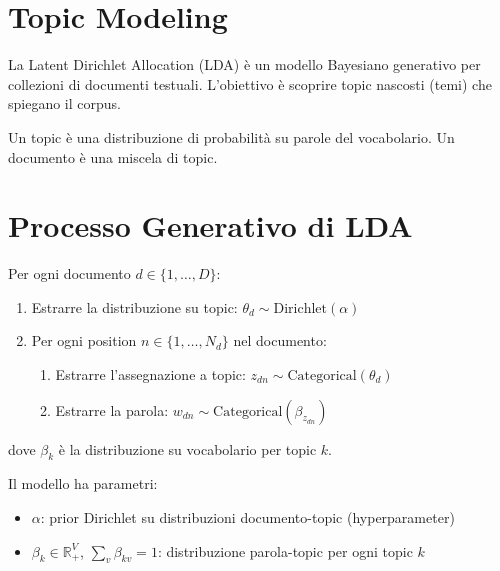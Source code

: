 \section{Topic Modeling}

La Latent Dirichlet Allocation (LDA) è un modello Bayesiano generativo per collezioni di documenti testuali. L'obiettivo è scoprire topic nascosti (temi) che spiegano il corpus.

\begin{definition}
  Un topic è una distribuzione di probabilità su parole del vocabolario. Un documento è una miscela di topic.
\end{definition}

\section{Processo Generativo di LDA}

\begin{theorem}
  Per ogni documento $d \in \{1, \ldots, D\}$:
  \begin{enumerate}
    \item Estrarre la distribuzione su topic: $\theta_d \sim \text{Dirichlet}(\alpha)$
    \item Per ogni position $n \in \{1, \ldots, N_d\}$ nel documento:
    \begin{enumerate}
      \item Estrarre l'assegnazione a topic: $z_{dn} \sim \text{Categorical}(\theta_d)$
      \item Estrarre la parola: $w_{dn} \sim \text{Categorical}(\beta_{z_{dn}})$
    \end{enumerate}
  \end{enumerate}
  dove $\beta_k$ è la distribuzione su vocabolario per topic $k$.
\end{theorem}

Il modello ha parametri:
\begin{itemize}
  \item $\alpha$: prior Dirichlet su distribuzioni documento-topic (hyperparameter)
  \item $\beta_{k} \in \mathbb{R}^V_+$, $\sum_v \beta_{kv} = 1$: distribuzione parola-topic per ogni topic $k$
\end{itemize}

